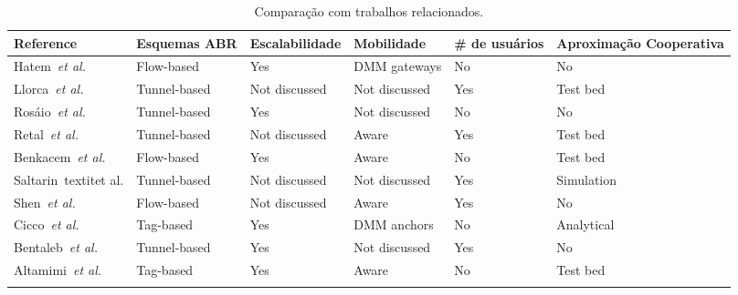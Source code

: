 \begin{table}[htb]
  \caption{Comparação com trabalhos relacionados.}
  \label{tab:comparison}
  \centering
  \scriptsize
  \begin{tabular}{p{3.6cm}p{2cm}p{2cm}p{2.2cm}p{2cm}p{2cm}}
    \toprule
    \textbf{Reference} &
    \textbf{Esquemas ABR} &
    \textbf{Escalabilidade} &
    \textbf{Mobilidade} &
    \textbf{\# de \newline usuários} &
    \textbf{Aproximação \newline Cooperativa} \\
    \midrule

    Hatem~\textit{et al.}~\cite{Ahmad2013a, Ahmad2013b} &
    Flow-based & Yes & \ac{DMM} gateways & No & No \\
    \addlinespace
    \addlinespace

    Llorca~\textit{et al.}~\cite{Banerjee2013} &
    Tunnel-based & Not discussed & Not discussed & Yes & Test bed \\
    \addlinespace
	\addlinespace
    Rosáio~\textit{et al.}~\cite{Basta2013a, Basta2014} &
    Tunnel-based & Yes & Not discussed & No & No \\
    \addlinespace
	\addlinespace
    Retal~\textit{et al.} \cite{Cho2014} &
    Tunnel-based & Not discussed & Aware & Yes & Test bed \\
    \addlinespace
	\addlinespace
    Benkacem~\textit{et al.} \cite{CostaRequena2014} &
    Flow-based & Yes & Aware & No & Test bed \\
    \addlinespace
	\addlinespace
    Saltarin~textit{et al.} \cite{Ghazisaeedi2013} &
    Tunnel-based & Not discussed & Not discussed & Yes & Simulation \\
    \addlinespace
	\addlinespace
    Shen~\textit{et al.} \cite{Guerzoni2014} &
    Flow-based & Not discussed & Aware & Yes & No \\
    \addlinespace
	\addlinespace

    Cicco~\textit{et al.} \cite{Gurusanthosh2013} &
    Tag-based & Yes & \ac{DMM} anchors & No & Analytical \\
    \addlinespace
	\addlinespace
	
    Bentaleb~\textit{et al.} \cite{Hampel2013} &
    Tunnel-based & Yes & Not discussed & Yes & No \\
    \addlinespace
	\addlinespace
	
    Altamimi~\textit{et al.} \cite{Jin2013a} &
    Tag-based & Yes & Aware & No & Test bed \\
    \addlinespace
	\addlinespace
	

\end{tabular}
\end{table}
